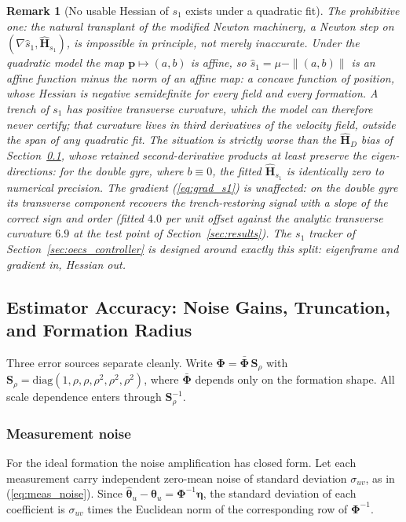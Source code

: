 \documentclass[lettersize,journal]{IEEEtran}
\newtheorem{remark}{Remark}
\begin{document}
\begin{remark}[No usable Hessian of $s_1$ exists under a quadratic fit]
\label{rem:s1hess}
The prohibitive one: the natural transplant of the modified Newton
machinery, a Newton step on $(\nabla \hat{s}_1, \hat{\mathbf{H}}_{s_1})$,
is impossible in principle, not merely inaccurate. Under the quadratic
model the map $\mathbf{p} \mapsto (a, b)$ is affine, so $\hat{s}_1 =
\mu - \|(a, b)\|$ is an affine function minus the norm of an affine
map: a concave function of position, whose Hessian is negative
semidefinite \emph{for every field and every formation}. A trench of
$s_1$ has positive transverse curvature, which the model can therefore
never certify; that curvature lives in third derivatives of the
velocity field, outside the span of any quadratic fit. The situation is
strictly worse than the $\hat{\mathbf{H}}_D$ bias of
Section~\ref{sec:sensitivity}, whose retained second-derivative
products at least preserve the eigen-directions: for the double gyre,
where $b \equiv 0$, the fitted $\hat{\mathbf{H}}_{s_1}$ is identically
zero to numerical precision. The gradient (\ref{eq:grad_s1}) is
unaffected: on the double gyre its transverse component recovers the
trench-restoring signal with a slope of the correct sign and order
(fitted $4.0$ per unit offset against the analytic transverse curvature
$6.9$ at the test point of Section~\ref{sec:results}). The $s_1$ tracker
of Section~\ref{sec:oecs_controller} is designed around exactly this
split: eigenframe and gradient in, Hessian out.
\end{remark}

\subsection{Estimator Accuracy: Noise Gains, Truncation, and Formation
Radius}
\label{sec:sensitivity}

Three error sources separate cleanly. Write $\boldsymbol{\Phi} =
\bar{\boldsymbol{\Phi}}\,\mathbf{S}_\rho$ with $\mathbf{S}_\rho =
\mathrm{diag}(1, \rho, \rho, \rho^2, \rho^2, \rho^2)$, where
$\bar{\boldsymbol{\Phi}}$ depends only on the formation shape. All
scale dependence enters through $\mathbf{S}_\rho^{-1}$.

\subsubsection{Measurement noise}
For the ideal formation the noise amplification has closed form. Let each
measurement carry independent zero-mean noise of standard deviation
$\sigma_{uv}$, as in (\ref{eq:meas_noise}). Since
$\hat{\boldsymbol{\theta}}_u - \boldsymbol{\theta}_u =
\boldsymbol{\Phi}^{-1}\boldsymbol{\eta}$, the standard deviation of each
coefficient is $\sigma_{uv}$ times the Euclidean norm of the
corresponding row of $\boldsymbol{\Phi}^{-1}$.
\end{document}
